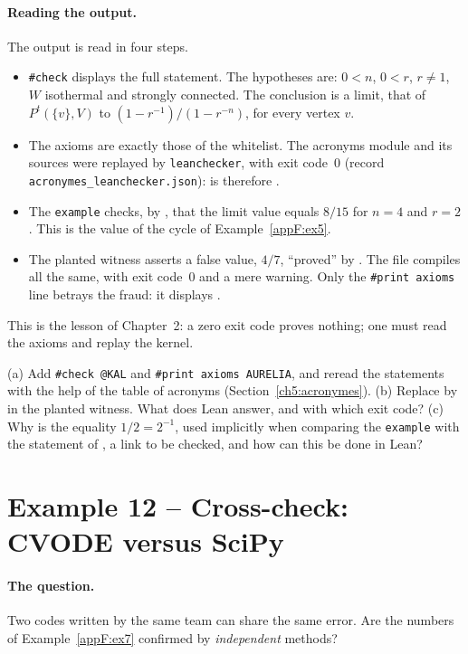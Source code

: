 \paragraph{Reading the output.} The output is read in four steps.
\begin{itemize}
\item \texttt{\#check} displays the full statement. The hypotheses are: $0<n$, $0<r$, $r\ne1$, $W$ isothermal and
strongly connected. The conclusion is a limit, that of $P^t(\{v\},V)$ to $(1-r^{-1})/(1-r^{-n})$, for every vertex $v$.
\item The axioms are exactly those of the whitelist. The acronyms module and its sources were replayed by
\texttt{leanchecker}, with exit code~0 (record \texttt{acronymes\_leanchecker.json}):  is therefore \tierA.
\item The \texttt{example} checks, by , that the limit value equals $8/15$ for $n=4$ and $r=2$. This is
the value of the cycle of Example~\ref{appF:ex5}.
\item The planted witness asserts a false value, $4/7$, ``proved'' by . The file compiles all the same, with
exit code~0 and a mere warning. Only the \texttt{\#print axioms} line betrays the fraud: it displays .
\end{itemize}
This is the lesson of Chapter~2: a zero exit code proves nothing; one must read the axioms and replay the kernel.

\begin{exercise}\label{appF:exo11}
(a) Add \texttt{\#check @KAL} and \texttt{\#print axioms AURELIA}, and reread the statements with the help of the table
of acronyms (Section~\ref{ch5:acronymes}). (b) Replace  by  in the planted witness.
What does Lean answer, and with which exit code? (c) Why is the equality $1/2=2^{-1}$, used implicitly when comparing
the \texttt{example} with the statement of , a link to be checked, and how can this be done in Lean?
\end{exercise}

\section{Example 12 -- Cross-check: CVODE versus SciPy}\label{appF:ex12}

\paragraph{The question.} Two codes written by the same team can share the same error. Are the numbers of
Example~\ref{appF:ex7} confirmed by \emph{independent} methods?

